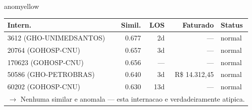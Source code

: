 \documentclass[a4paper,10pt]{article}
\begin{document}
\begin{anomalycard}[Internacao 19447 | GHO-PETROBRAS | MODERADO (z=2.23)]{anomyellow}
\begin{tabular}{l r r r l}\toprule\textbf{Intern.} & \textbf{Simil.} & \textbf{LOS} & \textbf{Faturado} & \textbf{Status} \\\midrule
3612 (GHO-UNIMEDSANTOS) & 0.677 & 2d & --- & \textcolor{jcubeblue}{normal} \\
20764 (GOHOSP-CNU) & 0.657 & 3d & --- & \textcolor{jcubeblue}{normal} \\
170623 (GOHOSP-CNU) & 0.656 & --- & --- & \textcolor{jcubeblue}{normal} \\
50586 (GHO-PETROBRAS) & 0.640 & 3d & R\$ 14.312,45 & \textcolor{jcubeblue}{normal} \\
60202 (GOHOSP-CNU) & 0.630 & 13d & --- & \textcolor{jcubeblue}{normal} \\
\multicolumn{5}{l}{\textcolor{jcubeblue}{\small $\rightarrow$ Nenhuma similar e anomala --- esta internacao e verdadeiramente atipica.}} \\
\bottomrule\end{tabular}


\end{anomalycard}

\newpage
\end{document}
